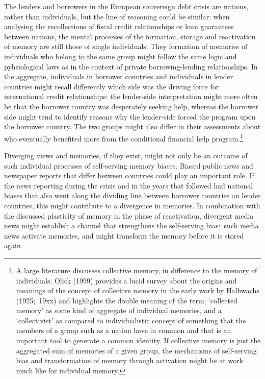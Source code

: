 The lenders and borrowers in the European souvereign debt crisis are
nations, rather than individuals, but the line of reasoning could be
similar: when analysing the recollections of fiscal credit relationships or
loan guarantees between nations, the mental processes of the formation,
storage and reactivation of memory are still those of single individuals.
They formation of memories of individuals who belong to the same group might
follow the same logic and pyhsiological laws as in the context of private
borrowing-lending relationships. In the aggregate, individuals in borrower
countries and individuals in lender countries might recall differently which
side was the driving force for international credit relationships: the
lender-side interpretation might more often be that the borrower country was
desperately seeking help, whereas the borrower side might tend to identify
reasons why the lender-side forced the program upon the borrower country.
The two groups might also differ in their assessments about who eventually
benefited more from the conditional financial help program.\footnote{%
A large literature discusses collective memory, in difference to the memory
of individuals. Olick (1999) provides a lucid survey about the origins and
meanings of the concept of collective memory in the early work by Halbwachs
(1925;\ 19xx) and highlights the double meaning of the term: `collected
memory' as some kind of aggregate of individual memories, and a
`collectivist' as compared to individualistic concept of something that the
members of a group such as a nation have in common and that is an important
tool to generate a common identity. If collective memory is just the
aggregated sum of memories of a given group, the mechanisms of self-serving
bias and transformation of memory through activation might be at work much
like for individual memory.}

Diverging views and memories, if they exist, might not only be an outcome of
such individual processes of self-serving memory biases. Biased public news
and newspaper reports that differ between countries could play an important
role. If the news reporting during the crisis and in the years that followed
had national biases that also went along the dividing line between borrower
countries an lender countries, this might contribute to a divergence in
memories. In combination with the discussed plasticity of memory in the
phase of reactivation, divergent media news might establish a channel that
strengthens the self-serving bias:\ such media news activate memories, and
might transform the memory before it is stored again.

